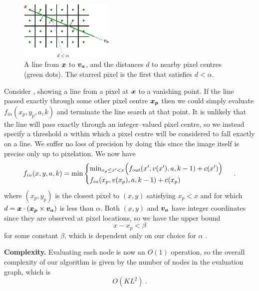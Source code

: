 \begin{figure}[tb]
\centering
\includegraphics[width=0.4\textwidth]{figures/pixel-residuals}
\caption{A line from $\boldsymbol{x}$ to $\boldsymbol{v_a}$, and the distances $d$
  to nearby pixel centres (green dots). The starred pixel is the first
  that satisfies $d<\alpha$.}
\label{fig:pixel-residuals}
\end{figure}

Consider , showing a line from a pixel at
$\boldsymbol{x}$ to a vanishing point. If the line passed exactly through
some other pixel centre $\boldsymbol{x_p}$ then we could simply evaluate
$f_{in}(x_p,y_p,a,k)$ and terminate the line search at that point. It
is unlikely that the line will pass exactly through an integer--valued
pixel centre, so we instead specify a threshold $\alpha$ within which
a pixel centre will be considered to fall exactly on a line. We suffer
no loss of precision by doing this since the image itself is precise
only up to pixelation. We now have
\begin{equation}
  \label{eq:fin-recurrence}
  f_{in}(x,y,a,k) = \min
  \begin{cases}
    \min_{x_p \leq x' < x}\Bigl(f_{out}(x',v(x'),a,k-1)+c(x')\Bigr) & \\
    f_{in}(x_p,v(x_p),a,k-1)+c(x_p) & \\
  \end{cases}
  ~.
\end{equation}
where $(x_p,y_p)$ is the closest pixel to $(x,y)$ satisfying $x_p<x$
and for which $d=\boldsymbol{x} \cdot (\boldsymbol{x_p} \times \boldsymbol{v_a})$ is
less than $\alpha$. Both $(x,y)$ and $\boldsymbol{v_a}$ have integer
coordinates since they are observed at pixel locations, so we have the
upper bound
\begin{equation}
  x-x_p<\beta
\end{equation}
for some constant $\beta$, which is dependent only on our choice for
$\alpha$ \cite{Schrijver98}.

\textbf{Complexity.} Evaluating each node is now an $O(1)$
operation, so the overall complexity of our algorithm is given by the
number of nodes in the evaluation graph, which is
\begin{equation}
  O(KL^2) ~.
\end{equation}

